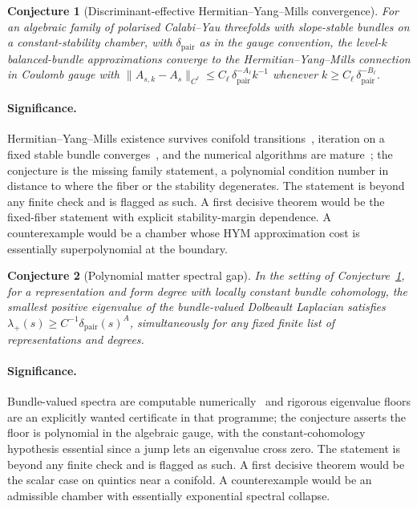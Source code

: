 \documentclass[11pt]{article}
\newtheorem{conjecture}{Conjecture}
\theoremstyle{definition}
\begin{document}
\begin{conjecture}[Discriminant-effective Hermitian--Yang--Mills convergence]\label{ad15}
For an algebraic family of polarised Calabi--Yau threefolds with slope-stable bundles on a constant-stability chamber, with $\delta_{\mathrm{pair}}$ as in the gauge convention, the level-$k$ balanced-bundle approximations converge to the Hermitian--Yang--Mills connection in Coulomb gauge with $\|A_{s,k}-A_s\|_{C^\ell}\le C_\ell\,\delta_{\mathrm{pair}}^{-A_\ell}k^{-1}$ whenever $k\ge C_\ell\,\delta_{\mathrm{pair}}^{-B_\ell}$.
\end{conjecture}

\paragraph{Significance.}
Hermitian--Yang--Mills existence survives conifold transitions~\cite{Chu12}, iteration on a fixed stable bundle converges~\cite{CSYZ26}, and the numerical algorithms are mature~\cite{ABKO10}; the conjecture is the missing family statement, a polynomial condition number in distance to where the fiber or the stability degenerates.  The statement is beyond any finite check and is flagged as such.  A first decisive theorem would be the fixed-fiber statement with explicit stability-margin dependence.  A counterexample would be a chamber whose HYM approximation cost is essentially superpolynomial at the boundary.

\begin{conjecture}[Polynomial matter spectral gap]\label{ad16}
In the setting of Conjecture~\ref{ad15}, for a representation and form degree with locally constant bundle cohomology, the smallest positive eigenvalue of the bundle-valued Dolbeault Laplacian satisfies $\lambda_+(s)\ge C^{-1}\delta_{\mathrm{pair}}(s)^{A}$, simultaneously for any fixed finite list of representations and degrees.
\end{conjecture}

\paragraph{Significance.}
Bundle-valued spectra are computable numerically~\cite{Ash24,AHHO23} and rigorous eigenvalue floors are an explicitly wanted certificate in that programme; the conjecture asserts the floor is polynomial in the algebraic gauge, with the constant-cohomology hypothesis essential since a jump lets an eigenvalue cross zero.  The statement is beyond any finite check and is flagged as such.  A first decisive theorem would be the scalar case on quintics near a conifold.  A counterexample would be an admissible chamber with essentially exponential spectral collapse.
\end{document}
